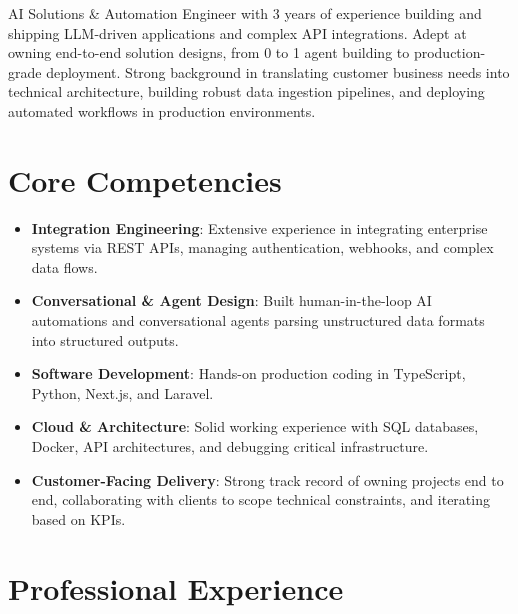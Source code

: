 \documentclass[11pt,a4paper,sans]{moderncv}
\begin{document}
\makecvtitle

AI Solutions \& Automation Engineer with 3 years of experience building and shipping LLM-driven applications and complex API integrations. Adept at owning end-to-end solution designs, from 0 to 1 agent building to production-grade deployment. Strong background in translating customer business needs into technical architecture, building robust data ingestion pipelines, and deploying automated workflows in production environments.

\vspace{2pt}

\section{Core Competencies}
\begin{itemize}
\item \textbf{Integration Engineering}: Extensive experience in integrating enterprise systems via REST APIs, managing authentication, webhooks, and complex data flows.
\item \textbf{Conversational \& Agent Design}: Built human-in-the-loop AI automations and conversational agents parsing unstructured data formats into structured outputs.
\item \textbf{Software Development}: Hands-on production coding in TypeScript, Python, Next.js, and Laravel.
\item \textbf{Cloud \& Architecture}: Solid working experience with SQL databases, Docker, API architectures, and debugging critical infrastructure.
\item \textbf{Customer-Facing Delivery}: Strong track record of owning projects end to end, collaborating with clients to scope technical constraints, and iterating based on KPIs.
\end{itemize}

\section{Professional Experience}

\vspace{3pt}
\end{document}
